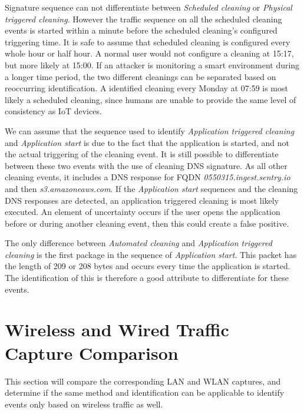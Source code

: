 Signature sequence can not differentiate between \textit{Scheduled cleaning} or \textit{Physical triggered cleaning}. However the traffic sequence on all the scheduled cleaning events is started within a minute before the scheduled cleaning's configured triggering time. It is safe to assume that scheduled cleaning is configured every whole hour or half hour. A normal user would not configure a cleaning at 15:17, but more likely at 15:00. If an attacker is monitoring a smart environment during a longer time period, the two different cleanings can be separated based on reoccurring identification. A identified cleaning every Monday at 07:59 is most likely a scheduled cleaning, since humans are unable to provide the same level of consistency as \gls{IoT} devices.

We can assume that the sequence used to identify \textit{Application triggered cleaning} and \textit{Application start} is due to the fact that the application is started, and not the actual triggering of the cleaning event. It is still possible to differentiate between these two events with the use of cleaning \gls{DNS} signature. As all other cleaning events, it includes a \gls{DNS} response for \gls{FQDN} \textit{0550315.ingest.sentry.io} and then \textit{s3.amazoneaws.com}. If the \textit{Application start} sequences and the cleaning \gls{DNS} responses are detected, an application triggered cleaning is most likely executed. An element of uncertainty occurs if the user opens the application before or during another cleaning event, then this could create a false positive. 

The only difference between \textit{Automated cleaning} and \textit{Application triggered cleaning} is the first package in the sequence of \textit{Application start}. This packet has the length of 209 or 208 bytes and occurs every time the application is started. The identification of this is therefore a good attribute to differentiate for these events.

\section{Wireless and Wired Traffic Capture Comparison}
This section will compare the corresponding \gls{LAN} and \gls{WLAN} captures, and determine if the same method and identification can be applicable to identify events only based on wireless traffic as well. 

